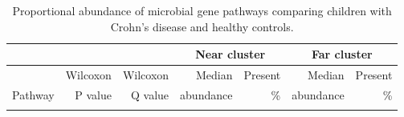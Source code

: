 \newpage
{\footnotesize
	\renewcommand{\arraystretch}{0.8} \setlength{\tabcolsep}{1pt}
	\begin{longtable}{ | l | r | r | r | r | r | r  | }
		\caption[Proportional abundance of microbial gene pathways comparing children with Crohn's disease and healthy controls.]{Proportional abundance of microbial gene pathways comparing children with Crohn's disease and healthy controls.} 
		\label{TS4} \\
		
		\hline
		\multicolumn{3}{|c|}{} & \multicolumn{2}{c}{Near cluster}
		& \multicolumn{2}{|c|}{Far cluster}\\
		\hline 
		& Wilcoxon & Wilcoxon & Median& Present & Median &  Present\\ 
		Pathway & P value & Q value & abundance & \% & abundance & \% \\ 
		\hline 
		\endfirsthead
		
		
		\endfoot
		
		\hline 
		\endlastfoot
		
		
		

\end{longtable}}

